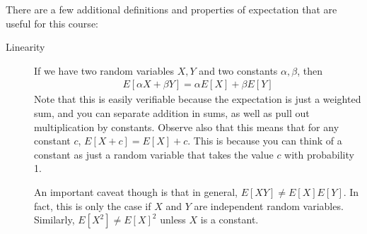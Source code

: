 There are a few additional definitions and properties of expectation that are useful for this course:
\begin{description}
    \item[Linearity] If we have two random variables $X, Y$ and two constants $\alpha, \beta$, then 
    \begin{align*}
        E[\alpha X + \beta Y] = \alpha E[X] + \beta E[Y]
    \end{align*} 
    Note that this is easily verifiable because the expectation is just a weighted sum, and you can separate addition in sums, as well as pull out multiplication by constants. Observe also that this means that for any constant $c$, $E[X + c] = E[X] + c$. This is because you can think of a constant as just a random variable that takes the value $c$ with probability 1. 

    An important caveat though is that in general, $E[XY] \neq E[X]E[Y]$. In fact, this is only the case if $X$ and $Y$ are independent random variables. Similarly, $E[X^2] \neq E[X]^2$ unless $X$ is a constant.


\end{description}
